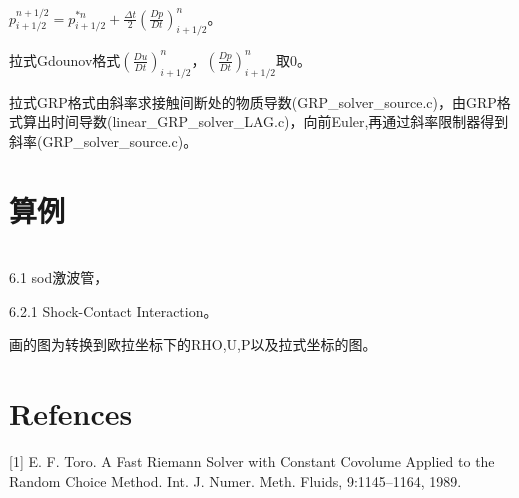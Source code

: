 \documentclass{article}
\begin{document}
$p_{i+1/2}^{n+1/2}=p_{i+1/2}^{*n}+\frac{\Delta t}{2}(\frac{D p}{D t})_{i+1/2}^{n}$。

拉式Gdounov格式$(\frac{D u}{D t})_{i+1/2}^{n}，(\frac{D p}{D t})_{i+1/2}^{n}$取0。

拉式GRP格式由斜率求接触间断处的物质导数(GRP\_solver\_source.c)，由GRP格式算出时间导数(linear\_GRP\_solver\_LAG.c)，向前Euler,再通过斜率限制器得到斜率(GRP\_solver\_source.c)。

\section{算例}
\ \\

6.1 sod激波管，

6.2.1 Shock-Contact Interaction。

画的图为转换到欧拉坐标下的RHO,U,P以及拉式坐标的图。


\section*{Refences}
[1] E. F. Toro. A Fast Riemann Solver with Constant Covolume Applied to the
Random Choice Method. Int. J. Numer. Meth. Fluids, 9:1145–1164, 1989.
\end{document}
